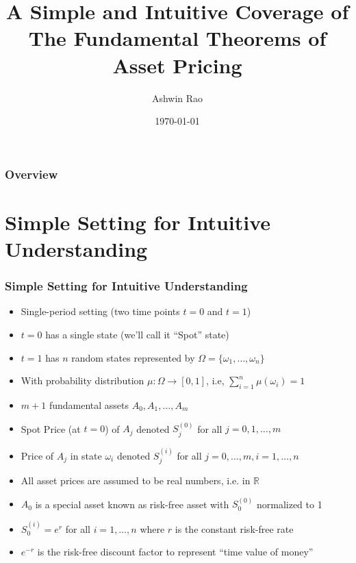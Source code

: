 \documentclass{beamer}
\title[Fundamental Theorems of Asset Pricing]{A Simple and Intuitive Coverage of \\ The Fundamental Theorems of Asset Pricing} %
\author{Ashwin Rao} %
\institute[Stanford] %
{
ICME, Stanford University
}
\date{\today} %
\begin{document}
\begin{frame}
\titlepage %
\end{frame}

\begin{frame}
\frametitle{Overview} %
\tableofcontents %
\end{frame}

\section{Simple Setting for Intuitive Understanding}

\begin{frame}
\frametitle{Simple Setting for Intuitive Understanding}
\begin{itemize}
\item Single-period setting (two time points $t=0$ and $t=1$)
\item $t=0$ has a single state (we'll call it ``Spot'' state)
\item $t=1$ has $n$ random states represented by $\Omega = \{\omega_1, \ldots, \omega_n\}$
\item With probability distribution $\mu: \Omega \rightarrow [0,1]$, i.e, $\sum_{i=1}^n \mu(\omega_i) = 1$
\item $m + 1$ fundamental assets $A_0, A_1, \ldots, A_m$
\item Spot Price (at $t=0$) of $A_j$ denoted $S_j^{(0)}$ for all $j = 0, 1, \ldots, m$
\item Price of $A_j$ in state $\omega_i$ denoted $S_j^{(i)}$ for all $j = 0, \ldots, m, i = 1, \ldots, n$
\item All asset prices are assumed to be real numbers, i.e. in $\mathbb{R}$
\item $A_0$ is a special asset known as risk-free asset with $S_0^{(0)}$ normalized to 1
\item $S_0^{(i)}= e^r$ for all $i = 1, \ldots, n$ where $r$ is the constant risk-free rate
\item $e^{-r}$ is the risk-free discount factor to represent ``time value of money''
\end{itemize}
\end{frame}
\end{document}
